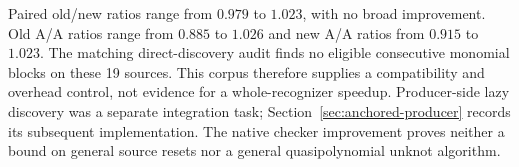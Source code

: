 

Paired old/new ratios range from $0.979$ to $1.023$, with no broad improvement.
Old A/A ratios range from $0.885$ to $1.026$ and new A/A ratios from $0.915$
to $1.023$. The matching direct-discovery audit finds no eligible consecutive
monomial blocks on these 19 sources. This corpus therefore supplies a
compatibility and overhead control, not evidence for a whole-recognizer
speedup. Producer-side lazy discovery was a separate integration task;
Section~\ref{sec:anchored-producer} records its subsequent implementation.
The native checker improvement proves neither a bound on general source
resets nor a general quasipolynomial unknot algorithm.
